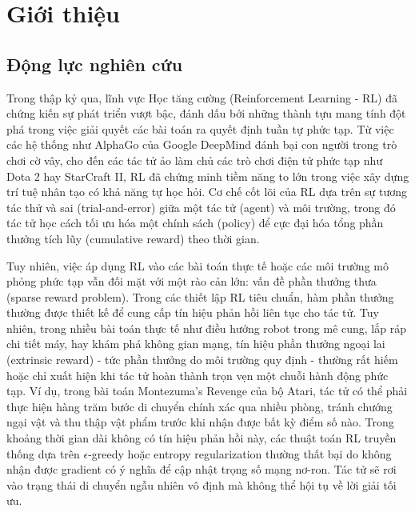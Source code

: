 \documentclass{uetgraduation}
\begin{document}
\chapter{Giới thiệu}

\section{Động lực nghiên cứu}

Trong thập kỷ qua, lĩnh vực Học tăng cường (Reinforcement Learning - RL) đã chứng kiến sự phát triển vượt bậc, đánh dấu bởi những thành tựu mang tính đột phá trong việc giải quyết các bài toán ra quyết định tuần tự phức tạp. Từ việc các hệ thống như AlphaGo của Google DeepMind đánh bại con người trong trò chơi cờ vây, cho đến các tác tử ảo làm chủ các trò chơi điện tử phức tạp như Dota 2 hay StarCraft II, RL đã chứng minh tiềm năng to lớn trong việc xây dựng trí tuệ nhân tạo có khả năng tự học hỏi. Cơ chế cốt lõi của RL dựa trên sự tương tác thử và sai (trial-and-error) giữa một tác tử (agent) và môi trường, trong đó tác tử học cách tối ưu hóa một chính sách (policy) để cực đại hóa tổng phần thưởng tích lũy (cumulative reward) theo thời gian.

Tuy nhiên, việc áp dụng RL vào các bài toán thực tế hoặc các môi trường mô phỏng phức tạp vẫn đối mặt với một rào cản lớn: vấn đề phần thưởng thưa (sparse reward problem). Trong các thiết lập RL tiêu chuẩn, hàm phần thưởng thường được thiết kế để cung cấp tín hiệu phản hồi liên tục cho tác tử. Tuy nhiên, trong nhiều bài toán thực tế như điều hướng robot trong mê cung, lắp ráp chi tiết máy, hay khám phá không gian mạng, tín hiệu phần thưởng ngoại lai (extrinsic reward) - tức phần thưởng do môi trường quy định - thường rất hiếm hoặc chỉ xuất hiện khi tác tử hoàn thành trọn vẹn một chuỗi hành động phức tạp. Ví dụ, trong bài toán Montezuma's Revenge của bộ Atari, tác tử có thể phải thực hiện hàng trăm bước di chuyển chính xác qua nhiều phòng, tránh chướng ngại vật và thu thập vật phẩm trước khi nhận được bất kỳ điểm số nào. Trong khoảng thời gian dài không có tín hiệu phản hồi này, các thuật toán RL truyền thống dựa trên $\epsilon$-greedy hoặc entropy regularization thường thất bại do không nhận được gradient có ý nghĩa để cập nhật trọng số mạng nơ-ron. Tác tử sẽ rơi vào trạng thái di chuyển ngẫu nhiên vô định mà không thể hội tụ về lời giải tối ưu.
\end{document}
